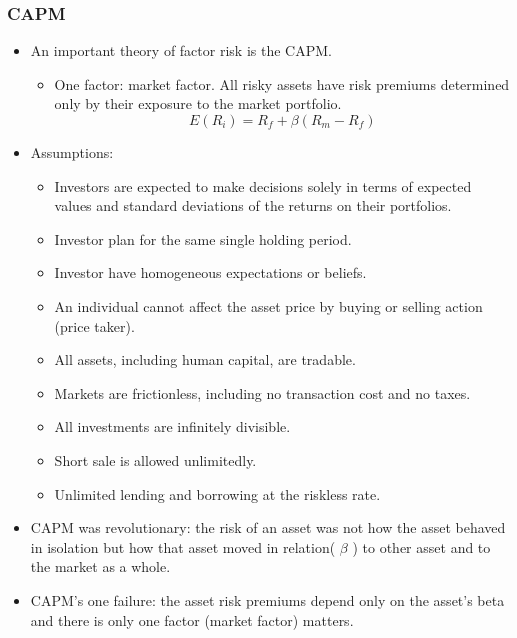 \subsubsection{CAPM}
\begin{itemize}
\item An important theory of factor risk is the CAPM.
    \begin{itemize}
    \item One factor: market factor. All risky assets have risk premiums determined only by their exposure to the market portfolio.
 \[
E(R_i) = R_f + \beta (R_m - R_f)
\]
    \end{itemize}
\item Assumptions:
    \begin{itemize}
    \item Investors are expected to make decisions solely in terms of expected values and standard deviations of the returns on their portfolios.
    \item Investor plan for the same single holding period.
    \item Investor have homogeneous expectations or beliefs.
    \item An individual cannot affect the asset price by buying or selling action (price taker).
    \item All assets, including human capital, are tradable.
    \item Markets are frictionless, including no transaction cost and no taxes.
    \item All investments are infinitely divisible.
    \item Short sale is allowed unlimitedly.
    \item Unlimited lending and borrowing at the riskless rate.
    \end{itemize}
\item CAPM was revolutionary: the risk of an asset was not how the asset behaved in isolation but how that asset moved in relation( $\beta$ ) to other asset and to the market as a whole.

\item CAPM's one failure: the asset risk premiums depend only on the asset's beta and there is only one factor (market factor) matters.


\end{itemize}
